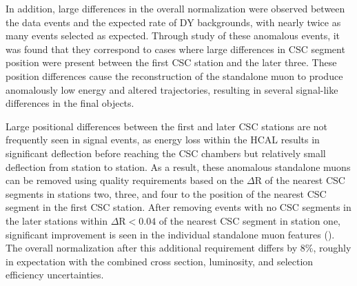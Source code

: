 In addition, large differences in the overall normalization were observed between the data events and the expected rate of DY backgrounds, with nearly twice as many events selected as expected.
Through study of these anomalous events, it was found that they correspond to cases where large differences in CSC segment position were present between the first CSC station and the later three.
These position differences cause the reconstruction of the standalone muon to produce anomalously low energy and altered trajectories, resulting in several signal-like differences in the final objects. 

Large positional differences between the first and later CSC stations are not frequently seen in signal events, as energy loss within the HCAL results in significant deflection before reaching the CSC chambers but relatively small deflection from station to station. 
As a result, these anomalous standalone muons can be removed using quality requirements based on the $\Delta$R of the nearest CSC segments in stations two, three, and four to the position of the nearest CSC segment in the first CSC station.
After removing events with no CSC segments in the later stations within $\Delta\mathrm{R}<0.04$ of the nearest CSC segment in station one, significant improvement is seen in the individual standalone muon features ().
The overall normalization after this additional requirement differs by $8\%$, roughly in expectation with the combined cross section, luminosity, and selection efficiency uncertainties.

